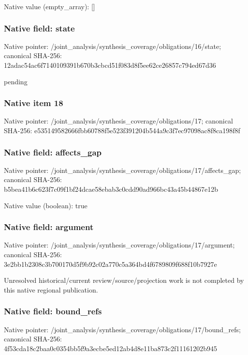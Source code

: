 \documentclass[10pt,a4paper]{article}
\begin{document}
Native value (empty\_\allowbreak{}array): []

\subsubsection{Native field: state}
Native pointer: /joint\_\allowbreak{}analysis/synthesis\_\allowbreak{}coverage/obligations/16/state; canonical SHA-256: 12adac54ac6f7140109391b670b3cbcd51f083d8f5ee62ce26857c794ed67d36

\begingroup\raggedright\sloppy pending\par\endgroup

\subsubsection{Native item 18}
Native pointer: /joint\_\allowbreak{}analysis/synthesis\_\allowbreak{}coverage/obligations/17; canonical SHA-256: e535149582666fbb60788f5e523f391204b544a9c3f7ec97098ac8f8ca198f8f

\subsubsection{Native field: affects\_\allowbreak{}gap}
Native pointer: /joint\_\allowbreak{}analysis/synthesis\_\allowbreak{}coverage/obligations/17/affects\_\allowbreak{}gap; canonical SHA-256: b5bea41b6c623f7c09f1bf24dcae58ebab3c0cdd90ad966bc43a45b44867e12b

Native value (boolean): true

\subsubsection{Native field: argument}
Native pointer: /joint\_\allowbreak{}analysis/synthesis\_\allowbreak{}coverage/obligations/17/argument; canonical SHA-256: 3e2bb1b2308c3b700170d5f9b92c02a770c5a364bd4f6789809f688f10b7927e

\begingroup\raggedright\sloppy Unresolved historical/\allowbreak{}current review/\allowbreak{}source/\allowbreak{}projection work is not completed by this native regional publication.\par\endgroup

\subsubsection{Native field: bound\_\allowbreak{}refs}
Native pointer: /joint\_\allowbreak{}analysis/synthesis\_\allowbreak{}coverage/obligations/17/bound\_\allowbreak{}refs; canonical SHA-256: 4f53cda18c2baa0c0354bb5f9a3ecbe5ed12ab4d8e11ba873c2f11161202b945
\end{document}
